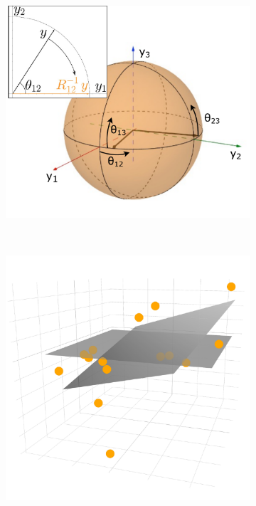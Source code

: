 \documentclass{article}
\begin{document}
\begin{figure}
    \centering
    \begin{subfigure}[b]{0.26\textwidth}
        \includegraphics[width=\textwidth]{StiefelGeom.pdf}
        \caption{}
        \label{fig:StiefelGeom}
    \end{subfigure}
    ~ %
    \begin{subfigure}[b]{0.25\textwidth}
        \includegraphics[width=\textwidth]{uncertainty.pdf}

\end{subfigure}
\end{figure}
\end{document}
